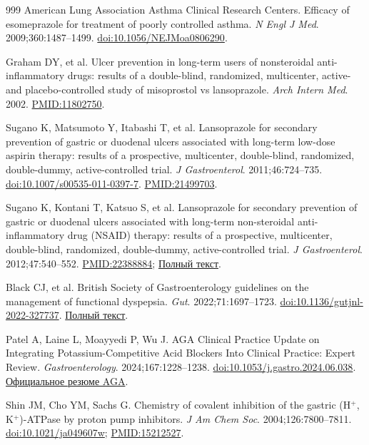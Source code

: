 \documentclass[11pt,a4paper,notitlepage]{report}
\begin{document}
\begin{thebibliography}{999}
 American Lung Association Asthma Clinical Research Centers. Efficacy of esomeprazole for treatment of poorly controlled asthma. \textit{N Engl J Med}. 2009;360:1487--1499. \href{https://doi.org/10.1056/NEJMoa0806290}{doi:10.1056/NEJMoa0806290}.

 Graham DY, et al. Ulcer prevention in long-term users of nonsteroidal anti-inflammatory drugs: results of a double-blind, randomized, multicenter, active- and placebo-controlled study of misoprostol vs lansoprazole. \textit{Arch Intern Med}. 2002. \href{https://pubmed.ncbi.nlm.nih.gov/11802750/}{PMID:11802750}.

 Sugano K, Matsumoto Y, Itabashi T, et al. Lansoprazole for secondary prevention of gastric or duodenal ulcers associated with long-term low-dose aspirin therapy: results of a prospective, multicenter, double-blind, randomized, double-dummy, active-controlled trial. \textit{J Gastroenterol}. 2011;46:724--735. \href{https://doi.org/10.1007/s00535-011-0397-7}{doi:10.1007/s00535-011-0397-7}. \href{https://pubmed.ncbi.nlm.nih.gov/21499703/}{PMID:21499703}.

 Sugano K, Kontani T, Katsuo S, et al. Lansoprazole for secondary prevention of gastric or duodenal ulcers associated with long-term non-steroidal anti-inflammatory drug (NSAID) therapy: results of a prospective, multicenter, double-blind, randomized, double-dummy, active-controlled trial. \textit{J Gastroenterol}. 2012;47:540--552. \href{https://pubmed.ncbi.nlm.nih.gov/22388884/}{PMID:22388884}; \href{https://pmc.ncbi.nlm.nih.gov/articles/PMC3360874/}{Полный текст}.

 Black CJ, et al. British Society of Gastroenterology guidelines on the management of functional dyspepsia. \textit{Gut}. 2022;71:1697--1723. \href{https://doi.org/10.1136/gutjnl-2022-327737}{doi:10.1136/gutjnl-2022-327737}. \href{https://pmc.ncbi.nlm.nih.gov/articles/PMC9380508/}{Полный текст}.

 Patel A, Laine L, Moayyedi P, Wu J. AGA Clinical Practice Update on Integrating Potassium-Competitive Acid Blockers Into Clinical Practice: Expert Review. \textit{Gastroenterology}. 2024;167:1228--1238. \href{https://doi.org/10.1053/j.gastro.2024.06.038}{doi:10.1053/j.gastro.2024.06.038}. \href{https://gastro.org/news/new-guidance-when-to-use-potassium-competitive-acid-blockers/}{Официальное резюме AGA}.

 Shin JM, Cho YM, Sachs G. Chemistry of covalent inhibition of the gastric (H$^+$, K$^+$)-ATPase by proton pump inhibitors. \textit{J Am Chem Soc}. 2004;126:7800--7811. \href{https://doi.org/10.1021/ja049607w}{doi:10.1021/ja049607w}; \href{https://pubmed.ncbi.nlm.nih.gov/15212527/}{PMID:15212527}.


\end{thebibliography}
\end{document}
